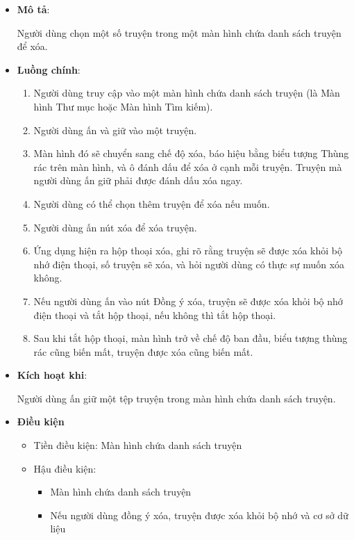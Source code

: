 \documentclass[
]{article}
\providecommand{\tightlist}{%
  \setlength{\itemsep}{0pt}\setlength{\parskip}{0pt}}
\begin{document}
\begin{itemize}
\item
  \textbf{Mô tả}:

  Người dùng chọn một số truyện trong một màn hình chứa danh sách truyện
  để xóa.
\item
  \textbf{Luồng chính}:

  \begin{enumerate}
  \def\labelenumi{\arabic{enumi}.}
  \tightlist
  \item
    Người dùng truy cập vào một màn hình chứa danh sách truyện (là Màn
    hình Thư mục hoặc Màn hình Tìm kiếm).
  \item
    Người dùng ấn và giữ vào một truyện.
  \item
    Màn hình đó sẽ chuyển sang chế độ xóa, báo hiệu bằng biểu tượng
    Thùng rác trên màn hình, và ô đánh dấu để xóa ở cạnh mỗi truyện.
    Truyện mà người dùng ấn giữ phải được đánh dấu xóa ngay.
  \item
    Người dùng có thể chọn thêm truyện để xóa nếu muốn.
  \item
    Người dùng ấn nút xóa để xóa truyện.
  \item
    Ứng dụng hiện ra hộp thoại xóa, ghi rõ rằng truyện sẽ được xóa khỏi
    bộ nhớ điện thoại, số truyện sẽ xóa, và hỏi người dùng có thực sự
    muốn xóa không.
  \item
    Nếu người dùng ấn vào nút Đồng ý xóa, truyện sẽ được xóa khỏi bộ nhớ
    điện thoại và tắt hộp thoại, nếu không thì tắt hộp thoại.
  \item
    Sau khi tắt hộp thoại, màn hình trở về chế độ ban đầu, biểu tượng
    thùng rác cũng biến mất, truyện được xóa cũng biến mất.
  \end{enumerate}
\item
  \textbf{Kích hoạt khi}:

  Người dùng ấn giữ một tệp truyện trong màn hình chứa danh sách truyện.
\item
  \textbf{Điều kiện}

  \begin{itemize}
  \item
    Tiền điều kiện: Màn hình chứa danh sách truyện
  \item
    Hậu điều kiện:

    \begin{itemize}
    \tightlist
    \item
      Màn hình chứa danh sách truyện
    \item
      Nếu người dùng đồng ý xóa, truyện được xóa khỏi bộ nhớ và cơ sở dữ
      liệu
    \end{itemize}
  \end{itemize}
\end{itemize}
\end{document}
